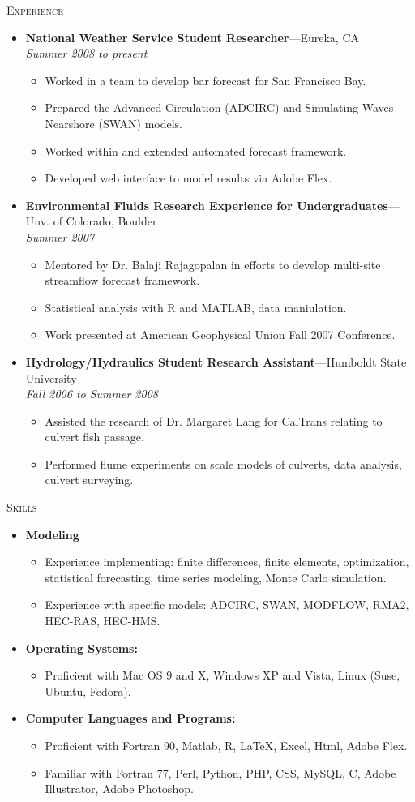 \documentclass[11pt,oneside]{article}
\newenvironment{ressection}[1]{
	\vspace{3pt}
	{\Large#1}
	\begin{itemize}
	\vspace{2pt}
}{
	\end{itemize}
}
\newcommand{\resitem}[1]{
	\vspace{-4pt}
	\item \begin{flushleft} #1 \end{flushleft}
}
\newcommand{\ressubitem}[1]{
	\vspace{-1pt}
	\item \begin{flushleft} #1 \end{flushleft}
}
\newcommand{\resbigitem}[3]{
	\vspace{-5pt}
	\item
	\textbf{#1}---#2 \\
	\textit{#3}
}
\newenvironment{ressubsec}[3]{
	\resbigitem{#1}{#2}{#3}
	\vspace{-2pt}
	\begin{itemize}
}{
	\end{itemize}
}
\newenvironment{reslist}[1]{
	\resitem{\textbf{#1}}
	\vspace{-5pt}
	\begin{itemize}
}{
	\end{itemize}
}
\begin{document}
\begin{ressection}{\scshape Experience}

	\begin{ressubsec}{National Weather Service Student Researcher}{Eureka, CA}{Summer 2008 to present}
		\ressubitem{Worked in a team to develop bar forecast for San Francisco Bay.}
		\ressubitem{Prepared the Advanced Circulation (ADCIRC) and Simulating Waves Nearshore (SWAN) models.}
		\ressubitem{Worked within and extended automated forecast framework.}
		\ressubitem{Developed web interface to model results via Adobe Flex.}
	\end{ressubsec}

	\begin{ressubsec}{Environmental Fluids Research Experience for Undergraduates}{Unv. of Colorado, Boulder}{Summer 2007}
		\ressubitem{Mentored by Dr. Balaji Rajagopalan in efforts to develop multi-site streamflow forecast framework.}
		\ressubitem{Statistical analysis with R and MATLAB, data maniulation.}
		\ressubitem{Work presented at American Geophysical Union Fall 2007 Conference.}
	\end{ressubsec}

	\begin{ressubsec}{Hydrology/Hydraulics Student Research Assistant}{Humboldt State University}{ Fall 2006 to Summer 2008}
		\ressubitem{Assisted the research of Dr. Margaret Lang for CalTrans relating to culvert fish passage.}
		\ressubitem{Performed flume experiments on scale models of culverts, data analysis, culvert surveying.}
	\end{ressubsec}

\end{ressection}


\begin{ressection}{\scshape Skills}
    
    \begin{reslist}{Modeling}
      \resitem{Experience implementing: finite differences, finite elements, optimization, statistical forecasting, time series modeling, Monte Carlo simulation.}
      \resitem{Experience with specific models: ADCIRC, SWAN, MODFLOW, RMA2, HEC-RAS, HEC-HMS.}
    \end{reslist}

	\begin{reslist}{Operating Systems:}
		\resitem{Proficient with Mac OS 9 and X, Windows XP and Vista, Linux (Suse, Ubuntu, Fedora).}
    \end{reslist}

	\begin{reslist}{Computer Languages and Programs:}

		\resitem{Proficient with Fortran 90, Matlab, R, \LaTeX, Excel, Html, Adobe Flex.}
		\resitem{Familiar with Fortran 77, Perl, Python, PHP, CSS, MySQL, C, Adobe Illustrator, Adobe Photoshop.}

	\end{reslist}



\end{ressection}
\end{document}
